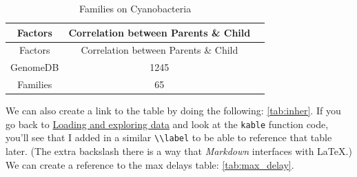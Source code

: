 \documentclass[12pt,twoside]{reedthesis}
\begin{document}
  \begin{longtable}[]{@{}ccl@{}}
  \caption{Families on Cyanobacteria \label{tab:inher}}\tabularnewline
  \toprule
  \begin{minipage}[b]{0.29\columnwidth}\centering\strut
  Factors\strut
  \end{minipage} & \begin{minipage}[b]{0.47\columnwidth}\centering\strut
  Correlation between Parents \& Child\strut
  \end{minipage} & \begin{minipage}[b]{0.16\columnwidth}\raggedright\strut
  \strut
  \end{minipage}\tabularnewline
  \midrule
  \endfirsthead
  \toprule
  \begin{minipage}[b]{0.29\columnwidth}\centering\strut
  Factors\strut
  \end{minipage} & \begin{minipage}[b]{0.47\columnwidth}\centering\strut
  Correlation between Parents \& Child\strut
  \end{minipage} & \begin{minipage}[b]{0.16\columnwidth}\raggedright\strut
  \strut
  \end{minipage}\tabularnewline
  \midrule
  \endhead
  \begin{minipage}[t]{0.29\columnwidth}\centering\strut
  GenomeDB\strut
  \end{minipage} & \begin{minipage}[t]{0.47\columnwidth}\centering\strut
  1245\strut
  \end{minipage} & \begin{minipage}[t]{0.16\columnwidth}\raggedright\strut
  \strut
  \end{minipage}\tabularnewline
  \begin{minipage}[t]{0.29\columnwidth}\centering\strut
  Families\strut
  \end{minipage} & \begin{minipage}[t]{0.47\columnwidth}\centering\strut
  65\strut
  \end{minipage} & \begin{minipage}[t]{0.16\columnwidth}\raggedright\strut
  \strut
  \end{minipage}\tabularnewline
  \bottomrule
  \end{longtable}
  
  We can also create a link to the table by doing the following:
  \autoref{tab:inher}. If you go back to
  \protect\hyperlink{loading-and-exploring-data}{Loading and exploring
  data} and look at the \texttt{kable} function code, you'll see that I
  added in a similar \texttt{\textbackslash{}\textbackslash{}label} to be
  able to reference that table later. (The extra backslash there is a way
  that \emph{Markdown} interfaces with \LaTeX.) We can create a reference
  to the max delays table: \autoref{tab:max_delay}.
  
\end{document}
